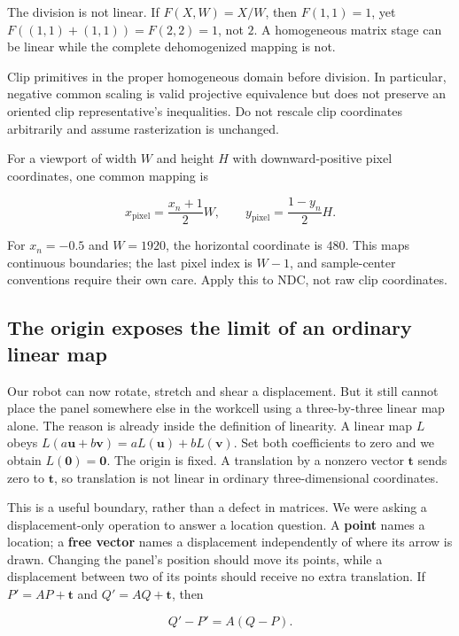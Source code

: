 The division is not linear. If \(F(X,W)=X/W\), then \(F(1,1)=1\), yet \(F((1,1)+(1,1))=F(2,2)=1\), not \(2\). A homogeneous matrix stage can be linear while the complete dehomogenized mapping is not.

Clip primitives in the proper homogeneous domain before division. In particular, negative common scaling is valid projective equivalence but does not preserve an oriented clip representative's inequalities. Do not rescale clip coordinates arbitrarily and assume rasterization is unchanged.

For a viewport of width \(W\) and height \(H\) with downward-positive pixel coordinates, one common mapping is

\[
x_{\mathrm{pixel}}=\frac{x_n+1}{2}W,\qquad
y_{\mathrm{pixel}}=\frac{1-y_n}{2}H.
\]

For \(x_n=-0.5\) and \(W=1920\), the horizontal coordinate is \(480\). This maps continuous boundaries; the last pixel index is \(W-1\), and sample-center conventions require their own care. Apply this to NDC, not raw clip coordinates.

\subsection{The origin exposes the limit of an ordinary linear map}\label{01-foundations-i-ch018-the-origin-exposes-the-limit-of-an-ordinary-linear-map}

Our robot can now rotate, stretch and shear a displacement. But it still cannot place the panel somewhere else in the workcell using a three-by-three linear map alone. The reason is already inside the definition of linearity. A linear map \(L\) obeys \(L(a\mathbf u+b\mathbf v)=aL(\mathbf u)+bL(\mathbf v)\). Set both coefficients to zero and we obtain \(L(\mathbf0)=\mathbf0\). The origin is fixed. A translation by a nonzero vector \(\mathbf t\) sends zero to \(\mathbf t\), so translation is not linear in ordinary three-dimensional coordinates.

This is a useful boundary, rather than a defect in matrices. We were asking a displacement-only operation to answer a location question. A \textbf{point} names a location; a \textbf{free vector} names a displacement independently of where its arrow is drawn. Changing the panel's position should move its points, while a displacement between two of its points should receive no extra translation. If \(P'=AP+\mathbf t\) and \(Q'=AQ+\mathbf t\), then

\[
Q'-P'=A(Q-P).
\]

